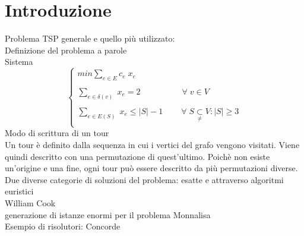 \chapter{Introduzione}
Problema TSP generale e quello più utilizzato:\\
Definizione del problema a parole\\
Sistema\\
$$
\begin{cases}
min \underset{e\in E}\sum{c_e\;x_e} \\\\
\underset{e\in \delta(v)}\sum{\;x_e} = 2\;\;\;\;\;\;\;\;\;\;\;\;\;\;\;\;\;\;\forall\;v\in V \\\\
\underset{e\in E(S)}\sum{\;x_e} \leq \vert S\vert - 1\;\;\;\;\;\;\;\;\forall\;S\underset{\neq} \subset V: \vert S\vert\geq 3\\
\end{cases}
$$
Modo di scrittura di un tour\\
Un tour è definito dalla sequenza in cui i vertici del grafo vengono visitati. Viene quindi descritto con una permutazione di quest'ultimo. Poichè non esiste un'origine e una fine, ogni tour può essere descritto da più permutazioni diverse.\\
Due diverse categorie di soluzioni del problema: esatte e attraverso algoritmi euristici\\
William Cook \cite{cook}\\
generazione di istanze enormi per il problema Monnalisa \cite{monnalisa}\\
Esempio di risolutori: Concorde \cite{concorde}\\
